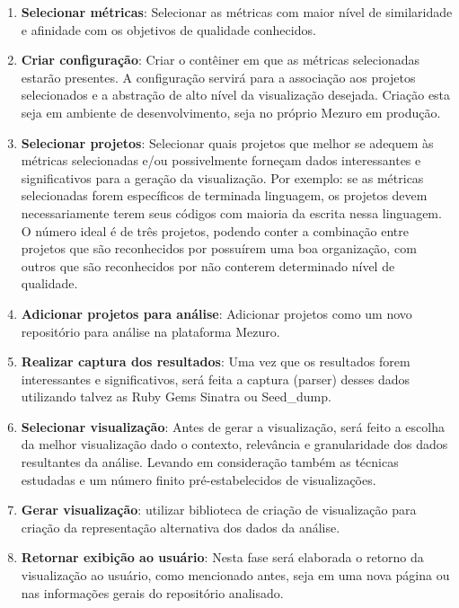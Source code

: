 \begin{enumerate}
  \item \textbf{Selecionar métricas}: Selecionar as métricas com maior nível de
  similaridade e afinidade com os objetivos de qualidade conhecidos.

  \item \textbf{Criar configuração}: Criar o contêiner em que as métricas
  selecionadas estarão presentes. A configuração servirá para a associação aos
  projetos selecionados e a abstração de alto nível da visualização desejada.
  Criação esta seja em ambiente de desenvolvimento, seja no próprio Mezuro em
  produção.

  \item \textbf{Selecionar projetos}: Selecionar quais projetos que melhor se
  adequem às métricas selecionadas e/ou possivelmente forneçam dados
  interessantes e significativos para a geração da visualização. Por exemplo:
  se as métricas selecionadas forem específicos de terminada linguagem, os
  projetos devem necessariamente terem seus códigos com maioria da escrita
  nessa linguagem. O número ideal é de três projetos, podendo conter a
  combinação entre projetos que são reconhecidos por possuírem uma boa
  organização, com outros que são reconhecidos por não conterem determinado
  nível de qualidade.

  \item \textbf{Adicionar projetos para análise}: Adicionar projetos como um
  novo repositório para análise na plataforma Mezuro.

  \item \textbf{Realizar captura dos resultados}: Uma vez que os resultados
  forem interessantes e significativos, será feita a captura (parser) desses
  dados utilizando talvez as Ruby Gems Sinatra ou Seed\_dump.

  \item \textbf{Selecionar visualização}: Antes de gerar a visualização, será
  feito a escolha da melhor visualização dado o contexto, relevância e
  granularidade dos dados resultantes da análise. Levando em consideração também
  as técnicas estudadas e um número finito pré-estabelecidos de visualizações.

  \item \textbf{Gerar visualização}: utilizar biblioteca de criação de
  visualização para criação da representação alternativa dos dados da análise.

  \item \textbf{Retornar exibição ao usuário}: Nesta fase será elaborada o
  retorno da visualização ao usuário, como mencionado antes, seja em uma nova
  página ou nas informações gerais do repositório analisado.
\end{enumerate}

